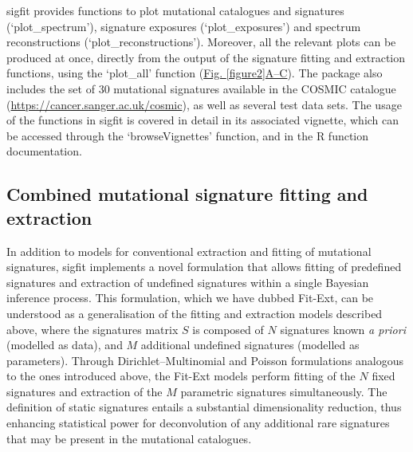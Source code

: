 sigfit provides functions to plot mutational catalogues and signatures (‘plot\_spectrum’), signature exposures (‘plot\_exposures’) and spectrum reconstructions (‘plot\_reconstructions’). Moreover, all the relevant plots can be produced at once, directly from the output of the signature fitting and extraction functions, using the ‘plot\_all’ function (\hyperref[figure2]{Fig. \ref*{figure2}A–C}). The package also includes the set of 30 mutational signatures available in the COSMIC catalogue (\url{https://cancer.sanger.ac.uk/cosmic}), as well as several test data sets. The usage of the functions in sigfit is covered in detail in its associated vignette, which can be accessed through the ‘browseVignettes’ function, and in the R function documentation.

\subsection*{Combined mutational signature fitting and extraction}
In addition to models for conventional extraction and fitting of mutational signatures, sigfit implements a novel formulation that allows fitting of predefined signatures and extraction of undefined signatures within a single Bayesian inference process. This formulation, which we have dubbed Fit-Ext, can be understood as a generalisation of the fitting and extraction models described above, where the signatures matrix $S$ is composed of $N$ signatures known \textit{a priori} (modelled as data), and $M$ additional undefined signatures (modelled as parameters). Through Dirichlet–Multinomial and Poisson formulations analogous to the ones introduced above, the Fit-Ext models perform fitting of the $N$ fixed signatures and extraction of the $M$ parametric signatures simultaneously. The definition of static signatures entails a substantial dimensionality reduction, thus enhancing statistical power for deconvolution of any additional rare signatures that may be present in the mutational catalogues. 

